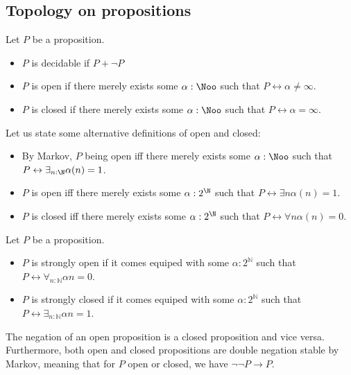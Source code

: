 \subsection{Topology on propositions}
\begin{definition}
  Let $P$ be a proposition. 
  \begin{itemize}
    \item $P$ is decidable if $P + \neg P$
    \item $P$ is open if there merely exists some $\alpha:\Noo$ such that $P \leftrightarrow \alpha \neq \infty$. 
    \item $P$ is closed if there merely exists some $\alpha:\Noo$ such that $P \leftrightarrow \alpha = \infty$. 
  \end{itemize}
\end{definition}

\begin{remark}
  Let us state some alternative definitions of open and closed:
  \begin{itemize}
    \item 
      By Markov, $P$ being open iff there merely exists some $\alpha:\Noo$ such that 
      $P\leftrightarrow \exists_{n:\N} \alpha(n) = 1$. 
    \item 
      $P$ is open iff there merely exists some $\alpha:2^\N$ such that $P\leftrightarrow \exists n \alpha(n) = 1$.
    \item 
      $P$ is closed iff there merely exists some $\alpha:2^\N$ such that $P\leftrightarrow \forall n \alpha(n) = 0$.
\end{itemize}
\end{remark}

\begin{definition}
  Let $P$ be a proposition. 
  \begin{itemize}
    \item $P$ is strongly open   if it comes equiped with some  $\alpha:2^\mathbb N$ such that $P \leftrightarrow \forall_{n:\mathbb N} \alpha n = 0 $. 
    \item $P$ is strongly closed if it comes equiped with some  $\alpha:2^\mathbb N$ such that 
      $P \leftrightarrow \exists_{n:\mathbb N} \alpha n = 1$. 
  \end{itemize}
\end{definition}

\begin{remark}\label{rmkOpenClosedNegation}
  The negation of an open proposition is a closed proposition and vice versa. 
  Furthermore, both open and closed propositions are double negation stable by Markov, 
  meaning that for $P$ open or closed, we have $\neg \neg P \to P$.
\end{remark}



